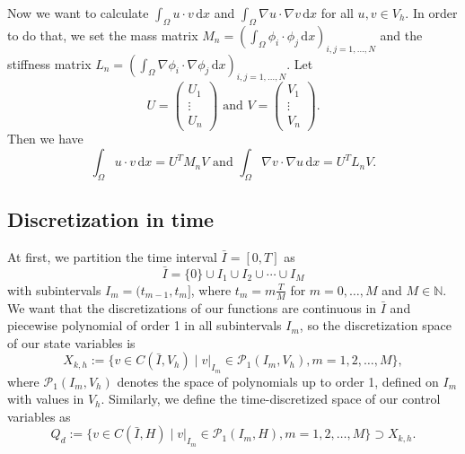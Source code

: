 Now we want to calculate $\int_\Omega u \cdot v \,\mathrm{d}x$ and $\int_\Omega \nabla u \cdot \nabla v \,\mathrm{d}x$ for all $u,v\in  V_h$. In order to do that, we set the mass matrix $M_n = \left(\int_\Omega \phi_i \cdot \phi_j \,\mathrm{d}x\right)_{i,j=1,\dotsc,N}$ and the stiffness matrix $L_n = \left(\int_\Omega \nabla\phi_i \cdot \nabla\phi_j \,\mathrm{d}x\right)_{i,j=1,\dotsc,N}$. Let%
\begin{displaymath}
U=\begin{pmatrix} U_1 \\ \vdots \\ U_n \end{pmatrix}\text{ and }V=\begin{pmatrix} V_1 \\ \vdots \\ V_n \end{pmatrix}.
\end{displaymath}
Then we have
\begin{displaymath}
\int_\Omega u \cdot v \,\mathrm{d}x=U^TM_nV\text{ and }\int_\Omega \nabla v \cdot \nabla u \,\mathrm{d}x=U^TL_nV.
\end{displaymath}


\subsection{\label{SubsectionDiscretizationInTime}Discretization in time}
At first, we partition the time interval $\bar{I}=[0,T]$ as
\begin{displaymath}
\bar{I}=\{0\}\cup I_1\cup I_2\cup\dotsb\cup I_M
\end{displaymath}
with subintervals $I_m=(t_{m-1},t_m]$, where $t_m=m\frac{T}{M}$ for $m=0,\dotsc, M$ and $M\in\mathbb{N}$. We want that the discretizations of our functions are continuous in $\bar{I}$ and piecewise polynomial of order 1 in all subintervals $I_m$, so the discretization space of our state variables is
\begin{displaymath}
X_{k,h}:=\{v\in C(\bar{I},V_h)\mid v |_{I_m}\in\mathcal{P}_1(I_m,V_h),m=1,2,\dotsc,M\},
\end{displaymath}
where $\mathcal{P}_1(I_m,V_h)$ denotes the space of polynomials up to order 1, defined on $I_m$ with values in $V_h$.
Similarly, we define the time-discretized space of our control variables as
\begin{displaymath}
Q_d:=\{v\in C(\bar{I},H)\mid v |_{I_m}\in\mathcal{P}_1(I_m,H),m=1,2,\dotsc,M\}\supset X_{k,h}.
\end{displaymath}

